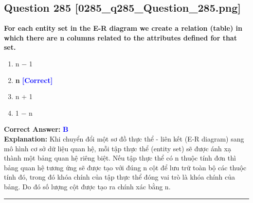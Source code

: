 \documentclass[11pt,a4paper]{article}
\begin{document}
\begin{minipage}{\textwidth}
\subsection*{Question 285 \quad \footnotesize{[0285\_q285\_Question\_285.png]}}
\noindent \textbf{For each entity set in the E-R diagram we create a relation (table) in which there are n columns related to the attributes defined for that set.}

\begin{enumerate}[label=\Alph*.]
    \item n − 1
    \item \textbf{n} \hfill \textcolor{blue}{\textbf{[Correct]}}
    \item n + 1
    \item 1 − n
\end{enumerate}

\noindent \textbf{Correct Answer:} \textcolor{blue}{\textbf{B}} \\[2pt]
\noindent \textbf{Explanation:} Khi chuyển đổi một sơ đồ thực thể - liên kết (E-R diagram) sang mô hình cơ sở dữ liệu quan hệ, mỗi tập thực thể (entity set) sẽ được ánh xạ thành một bảng quan hệ riêng biệt. Nếu tập thực thể có n thuộc tính đơn thì bảng quan hệ tương ứng sẽ được tạo với đúng n cột để lưu trữ toàn bộ các thuộc tính đó, trong đó khóa chính của tập thực thể đóng vai trò là khóa chính của bảng. Do đó số lượng cột được tạo ra chính xác bằng n.

\par\vspace{0.3cm}
\hrule
\vspace{0.3cm}
\end{minipage}
\end{document}
